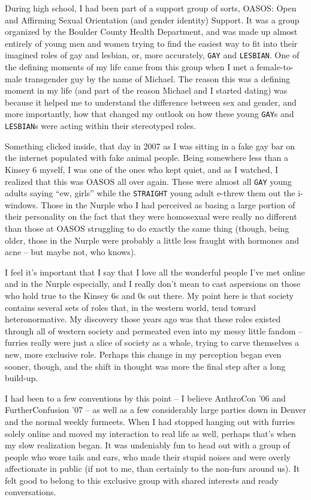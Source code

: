 During high school, I had been part of a support group of sorts, OASOS: Open and Affirming Sexual Orientation (and gender identity) Support.  It was a group organized by the Boulder County Health Department, and was made up almost entirely of young men and women trying to find the easiest way to fit into their imagined roles of gay and lesbian, or, more accurately, \texttt{GAY} and \texttt{LESBIAN}.  One of the defining moments of my life came from this group when I met a female-to-male transgender guy by the name of Michael.  The reason this was a defining moment in my life (and part of the reason Michael and I started dating) was because it helped me to understand the difference between sex and gender, and more importantly, how that changed my outlook on how these young \texttt{GAY}s and \texttt{LESBIAN}s were acting within their stereotyped roles.

Something clicked inside, that day in 2007 as I was sitting in a fake gay bar on the internet populated with fake animal people. Being somewhere less than a Kinsey 6 myself, I was one of the ones who kept quiet, and as I watched, I realized that this was OASOS all over again.  These were almost all \texttt{GAY} young adults saying ``ew, girls'' while the \texttt{STRAIGHT} young adult e-threw them out the i-windows.  Those in the Nurple who I had perceived as basing a large portion of their personality on the fact that they were homosexual were really no different than those at OASOS struggling to do exactly the same thing (though, being older, those in the Nurple were probably a little less fraught with hormones and acne -- but maybe not, who knows).

I feel it's important that I say that I love all the wonderful people I've met online and in the Nurple especially, and I really don't mean to cast aspersions on those who hold true to the Kinsey 6s and 0s out there.  My point here is that society contains several sets of roles that, in the western world, tend toward heteronormative. My discovery those years ago was that these roles existed through all of western society and permeated even into my messy little fandom -- furries really were just a slice of society as a whole, trying to carve themselves a new, more exclusive role.  Perhaps this change in my perception began even sooner, though, and the shift in thought was more the final step after a long build-up.

I had been to a few conventions by this point -- I believe AnthroCon '06 and FurtherConfusion '07 -- as well as a few considerably large parties down in Denver and the normal weekly furmeets.  When I had stopped hanging out with furries solely online and moved my interaction to real life as well, perhaps that's when my slow realization began.  It was undeniably fun to head out with a group of people who wore tails and ears, who made their stupid noises and were overly affectionate in public (if not to me, than certainly to the non-furs around us).  It felt good to belong to this exclusive group with shared interests and ready conversations.

